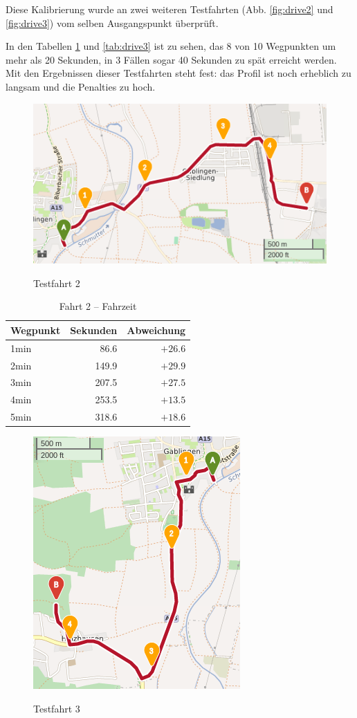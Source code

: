 \documentclass[12pt,a4paper]{article}
\begin{document}
Diese Kalibrierung wurde an zwei weiteren Testfahrten (Abb. \ref{fig:drive2} und \ref{fig:drive3}) vom selben Ausgangspunkt überprüft.

In den Tabellen \ref{tab:drive2} und \ref{tab:drive3} ist zu sehen, das 8 von 10 Wegpunkten um mehr als 20 Sekunden, in 3 Fällen sogar 40 Sekunden zu spät erreicht werden.
Mit den Ergebnissen dieser Testfahrten steht fest: das Profil ist noch erheblich zu langsam und die Penalties zu hoch.

\begin{figure}[h]
\centering
\caption{Testfahrt 2}
\label{drive2}
\includegraphics[width = 0.70 \textwidth]{../media/Fahrt2crop.png} \\
\end{figure}

\begin{table}[]
\centering
\caption{Fahrt 2 -- Fahrzeit}
\label{tab:drive2}
\begin{tabular}{|l|r|r|}
\hline
Wegpunkt & Sekunden & Abweichung \\ \hline 
1min & 86.6 & $+26.6$ \\
2min & 149.9 & $+29.9$ \\
3min & 207.5 & $+27.5$ \\
4min & 253.5 & $+13.5$ \\
5min & 318.6 & $+18.6$ \\
\hline
\end{tabular}
\end{table}


\begin{figure}[h]
\centering
\caption{Testfahrt 3}
\label{drive3}
\includegraphics[width = 0.40 \textwidth]{../media/Fahrt3crop.png} \\
\end{figure}
\end{document}
